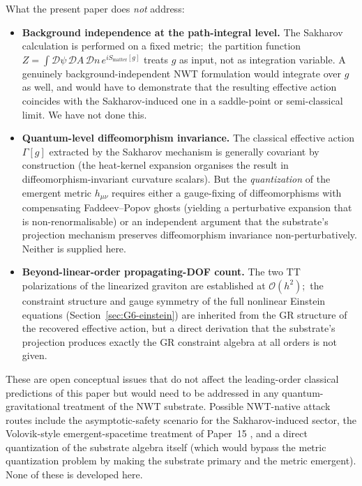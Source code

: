 \documentclass[11pt]{article}
\begin{document}
What the present paper does \emph{not} address:
\begin{itemize}
\item \textbf{Background independence at the path-integral level.}
      The Sakharov calculation is performed on a fixed metric;\ the
      partition function $Z = \int \mathcal{D}\psi\,
      \mathcal{D}A\,\mathcal{D}n \, e^{i S_{\mathrm{matter}}[g]}$
      treats $g$ as input, not as integration variable.  A genuinely
      background-independent NWT formulation would integrate over
      $g$ as well, and would have to demonstrate that the resulting
      effective action coincides with the Sakharov-induced one in
      a saddle-point or semi-classical limit.  We have not done
      this.
\item \textbf{Quantum-level diffeomorphism invariance.}  The
      classical effective action $\Gamma[g]$ extracted by the
      Sakharov mechanism is generally covariant by construction
      (the heat-kernel expansion organises the result in
      diffeomorphism-invariant curvature scalars).  But the
      \emph{quantization} of the emergent metric $h_{\mu\nu}$
      requires either a gauge-fixing of diffeomorphisms with
      compensating Faddeev--Popov ghosts (yielding a perturbative
      expansion that is non-renormalisable) or an independent
      argument that the substrate's projection mechanism preserves
      diffeomorphism invariance non-perturbatively.  Neither is
      supplied here.
\item \textbf{Beyond-linear-order propagating-DOF count.}  The
      two TT polarizations of the linearized graviton are
      established at $\mathcal{O}(h^2)$;\ the constraint structure
      and gauge symmetry of the full nonlinear Einstein equations
      (Section~\ref{sec:G6-einstein}) are inherited from the GR
      structure of the recovered effective action, but a direct
      derivation that the substrate's projection produces exactly
      the GR constraint algebra at all orders is not given.
\end{itemize}
These are open conceptual issues that do not affect the
leading-order classical predictions of this paper but would need to
be addressed in any quantum-gravitational treatment of the NWT
substrate.  Possible NWT-native attack routes include the
asymptotic-safety scenario for the Sakharov-induced sector, the
Volovik-style emergent-spacetime treatment of Paper~15
\cite{paper15}, and a direct quantization of the substrate algebra
itself (which would bypass the metric quantization problem by
making the substrate primary and the metric emergent).  None of
these is developed here.
\end{document}
